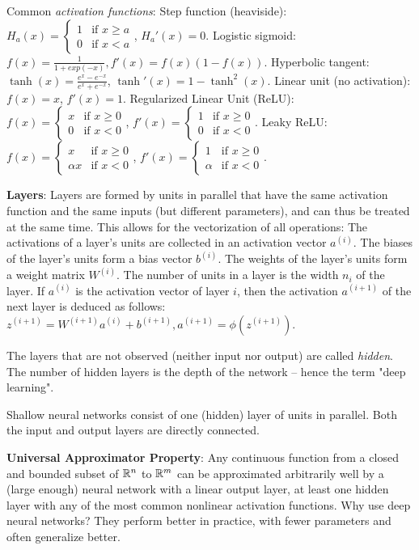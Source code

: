 Common \textit{activation functions}: 
Step function (heaviside): 
$H_a (x) = \begin{cases} 
1 & \mbox{if } x \geq a \\
0 & \mbox{if } x < a
\end{cases}$, $H_a' (x) = 0$.
Logistic sigmoid: $f(x) = \frac{1}{1+exp(-x)}, f'(x) = f(x)(1-f(x))$.
Hyperbolic tangent: $\tanh(x) = \frac{e^x - e^{-x}}{e^x + e^{-x}}$, $\tanh'(x)=1-\tanh^2(x)$.
Linear unit (no activation): $f(x)=x$, $f'(x)=1$.
Regularized Linear Unit (ReLU): $f(x) = \begin{cases} 
x & \mbox{if } x \geq 0 \\
0 & \mbox{if } x < 0
\end{cases}$, $f' (x) = \begin{cases} 
1 & \mbox{if } x \geq 0 \\
0 & \mbox{if } x < 0
\end{cases}$.
Leaky ReLU: $f(x) = \begin{cases} 
x & \mbox{if } x \geq 0 \\
\alpha x & \mbox{if } x < 0
\end{cases}$, $f' (x) = \begin{cases} 
1 & \mbox{if } x \geq 0 \\
\alpha & \mbox{if } x < 0
\end{cases}$.

\textbf{Layers}: Layers are formed by units in parallel that have the same activation function and
the same inputs (but different parameters), and can thus be treated at the same time.
This allows for the vectorization of all operations:
The activations of a layer’s units are collected in an activation vector $a^{(i)}$. 
The biases of the layer’s units form a bias vector $b^{(i)}$.
The weights of the layer’s units form a weight matrix $W^{(i)}$.
The number of units in a layer is the width $n_i$ of the layer.
If $a^{(i)}$ is the activation vector of layer $i$, then the activation $a^{(i+1)}$ of the next layer is deduced as follows:
$z^{(i+1)} = W^{(i+1)}a^{(i)} + b^{(i+1)}, a^{(i+1)}=\phi (z^{(i+1)})$.

The layers that are not observed (neither input nor output) are called \textit{hidden}.
The number of hidden layers is the depth of the network – hence the term "deep learning".

Shallow neural networks consist of one (hidden) layer of units in parallel. 
Both the input and output layers are directly connected.

\textbf{Universal Approximator Property}: Any continuous function from a closed and bounded subset of $\mathbb{R}^n$ to $\mathbb{R}^m$ can be approximated arbitrarily well by a (large enough) neural network with a linear output layer, at least one hidden layer with any of the most common nonlinear activation
functions.
Why use deep neural networks? They perform better in practice, with fewer parameters and often generalize better.

